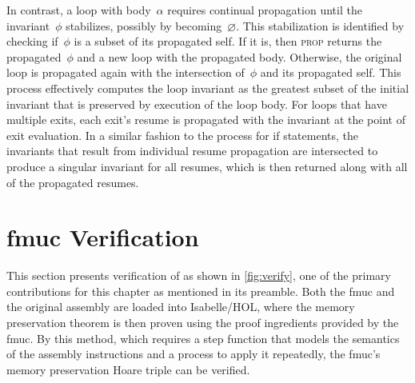 In contrast, a loop with body~$\alpha$ requires continual propagation
until the invariant~$\phi$ stabilizes, possibly by becoming~$\varnothing$.%
This stabilization is identified
by checking if~$\phi$ is a subset of its propagated self.
If it is, then \textsc{prop} returns the propagated~$\phi$
and a new loop with the propagated body.
Otherwise,
the original loop is propagated again with the intersection of~$\phi$
and its propagated self.
This process effectively computes the loop invariant
as the greatest subset of the initial invariant
that is preserved by execution of the loop body.
For loops that have multiple exits,
each exit's resume is propagated with the invariant at the point of exit evaluation.
In a similar fashion to the process for if statements,
the invariants that result from individual resume propagation
are intersected to produce a singular invariant for all resumes,
which is then returned along with all of the propagated resumes.

\section{\acs*{fmuc} Verification}\label{se:fmuc_ver}
This section presents verification of  as shown in \cref{fig:verify},
one of the primary contributions for this chapter as mentioned in its preamble.
Both the \ac{fmuc} and the original assembly are loaded into Isabelle/HOL,
where the memory preservation theorem is then proven using the proof ingredients
provided by the \ac{fmuc}.
By this method, which requires a step function
that models the semantics of the assembly instructions
and a process to apply it repeatedly,
the \ac{fmuc}'s memory preservation Hoare triple can be verified.

\begin{figure*}
  \centering
  \caption{Overview of \acs*{fmuc} verification}\label{fig:verify}
\end{figure*}

